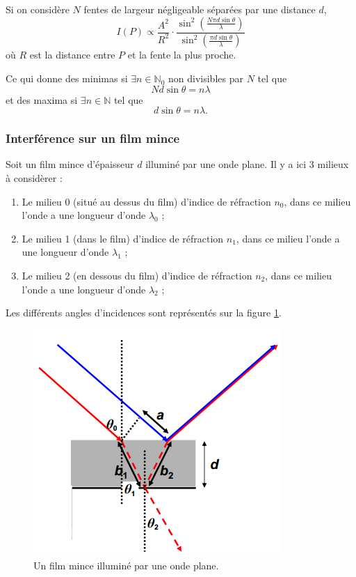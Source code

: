 Si on considère $N$ fentes de largeur négligeable séparées par une
distance $d$,
\[ I(P) \propto \frac{A^2}{R^2} \cdot
  \frac{\sin^2\left(\frac{N \pi d \sin\theta}{\lambda}\right)}
{\sin^2\left(\frac{\pi d \sin\theta}{\lambda}\right)} \]
où $R$ est la distance entre $P$ et la fente la plus proche.

Ce qui donne des minimas si
$\exists n \in \mathbb{N}_0$ non divisibles par $N$ tel que
\[ N d \sin \theta = n \lambda \]
et des maxima si $\exists n \in \mathbb{N}$ tel que
\[ d \sin \theta = n \lambda. \]

\subsubsection{Interférence sur un film mince}
Soit un film mince d'épaisseur $d$ illuminé par une onde
plane. Il y a ici 3 milieux à considèrer :

\begin{enumerate}
	\item Le milieu 0 (situé au dessus du film) d'indice
	de réfraction $n_0$, dans ce milieu l'onde a une longueur
	d'onde $\lambda_0$ ;
	\item Le milieu 1 (dans le film) d'indice de réfraction
	$n_1$, dans ce milieu l'onde a une longueur d'onde $\lambda_1$ ;
	\item Le milieu 2 (en dessous du film) d'indice de réfraction
	$n_2$, dans ce milieu l'onde a une longueur d'onde $\lambda_2$ ;
\end{enumerate}

Les différents angles d'incidences sont représentés sur la
figure \ref{fig:film-mince}.

\begin{figure}[ht!]
	\centering
		\includegraphics[scale=1.0]{film-mince.png}
		\caption{Un film mince illuminé par une onde plane.}
		\label{fig:film-mince}
\end{figure}

